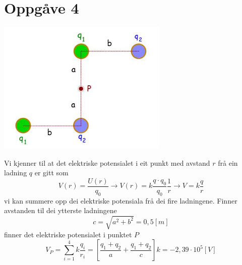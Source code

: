 \documentclass[12pt,a4paper]{article}
\begin{document}
  \section*{Oppgåve 4}
    \begin{center}
      \includegraphics[scale=0.6]{06_4.png}
    \end{center}
    Vi kjenner til at det elektriske potensialet i eit punkt med avstand $r$ frå ein 
    ladning $q$ er gitt som
    \begin{equation}
      V(r) = \frac{U(r)}{q_0} \rightarrow V(r) = k\frac{q\cdot q_0}{q_0}\frac{1}{r}
      \rightarrow V = k\frac{q}{r}
    \end{equation}
    vi kan summere opp dei elektriske potensiala frå dei fire ladningene. Finner avstanden
    til dei ytterste ladningene
    \begin{equation}
      c = \sqrt{a^2 + b^2} = 0,5[m]
    \end{equation}
    finner det elektriske potensialet i punktet $P$
    \begin{equation}
      V_{P} = \sum_{i=1}^4 k\frac{q_i}{r_i} =
      \left[\frac{q_1 + q_2}{a} + 
            \frac{q_1 + q_2}{c} \right] k =
            -2,39 \cdot 10^5 [V]
    \end{equation}
\end{document}
